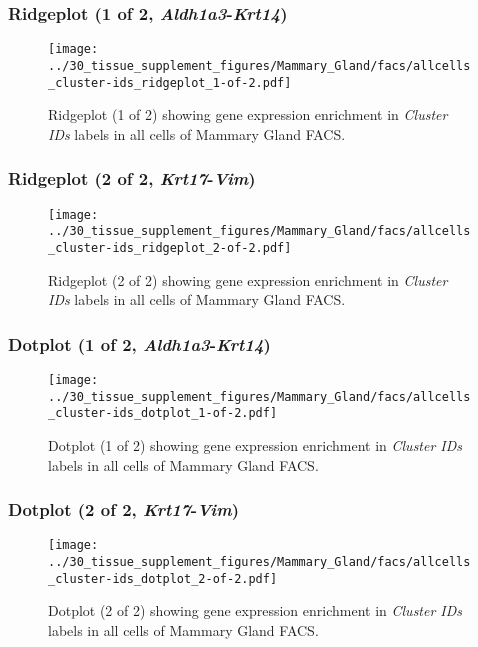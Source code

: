 \subsubsection{Ridgeplot (1 of 2, \emph{Aldh1a3}-\emph{Krt14})}
\begin{figure}[h]
\centering
\texttt{[image: ../30\_tissue\_supplement\_figures/Mammary\_Gland/facs/allcells\_cluster-ids\_ridgeplot\_1-of-2.pdf]}

\caption{ Ridgeplot (1 of 2)  showing gene expression enrichment in \emph{Cluster IDs} labels in all cells of Mammary Gland FACS. }
\end{figure}


\clearpage

\subsubsection{Ridgeplot (2 of 2, \emph{Krt17}-\emph{Vim})}
\begin{figure}[h]
\centering
\texttt{[image: ../30\_tissue\_supplement\_figures/Mammary\_Gland/facs/allcells\_cluster-ids\_ridgeplot\_2-of-2.pdf]}

\caption{ Ridgeplot (2 of 2)  showing gene expression enrichment in \emph{Cluster IDs} labels in all cells of Mammary Gland FACS. }
\end{figure}


\clearpage

\subsubsection{Dotplot (1 of 2, \emph{Aldh1a3}-\emph{Krt14})}
\begin{figure}[h]
\centering
\texttt{[image: ../30\_tissue\_supplement\_figures/Mammary\_Gland/facs/allcells\_cluster-ids\_dotplot\_1-of-2.pdf]}

\caption{ Dotplot (1 of 2)  showing gene expression enrichment in \emph{Cluster IDs} labels in all cells of Mammary Gland FACS. }
\end{figure}


\clearpage

\subsubsection{Dotplot (2 of 2, \emph{Krt17}-\emph{Vim})}
\begin{figure}[h]
\centering
\texttt{[image: ../30\_tissue\_supplement\_figures/Mammary\_Gland/facs/allcells\_cluster-ids\_dotplot\_2-of-2.pdf]}

\caption{ Dotplot (2 of 2)  showing gene expression enrichment in \emph{Cluster IDs} labels in all cells of Mammary Gland FACS. }
\end{figure}



